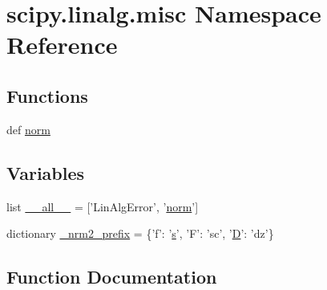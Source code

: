 \hypertarget{namespacescipy_1_1linalg_1_1misc}{}\section{scipy.\+linalg.\+misc Namespace Reference}
\label{namespacescipy_1_1linalg_1_1misc}
\subsection*{Functions}
\begin{DoxyCompactItemize}
\item 
def \hyperlink{namespacescipy_1_1linalg_1_1misc_a72d14d84fe57ff46eed95e01eba04c72}{norm}
\end{DoxyCompactItemize}
\subsection*{Variables}
\begin{DoxyCompactItemize}
\item 
list \hyperlink{namespacescipy_1_1linalg_1_1misc_a71866d9c3fe8f2d50e79819bde1da3fe}{\+\_\+\+\_\+all\+\_\+\+\_\+} = \mbox{[}'Lin\+Alg\+Error', '\hyperlink{namespacescipy_1_1linalg_1_1misc_a72d14d84fe57ff46eed95e01eba04c72}{norm}'\mbox{]}
\item 
dictionary \hyperlink{namespacescipy_1_1linalg_1_1misc_aec5db2f7ab880edacfa07edc1a9d0075}{\+\_\+nrm2\+\_\+prefix} = \{'f'\+: '\hyperlink{indexexpr_8h_ae024b0db549122b44c349ae28ec990dc}{s}', 'F'\+: 'sc', '\hyperlink{odrpack_8h_a7dae6ea403d00f3687f24a874e67d139}{D}'\+: 'dz'\}
\end{DoxyCompactItemize}


\subsection{Function Documentation}
\hypertarget{namespacescipy_1_1linalg_1_1misc_a72d14d84fe57ff46eed95e01eba04c72}{}
